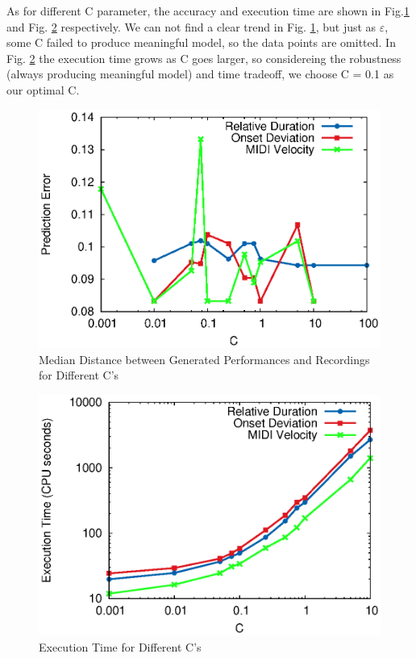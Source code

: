 As for different C parameter, the accuracy and execution time are shown in Fig.\ref{fig:c_accu} and Fig. \ref{fig:c_time} respectively. We can not find a clear trend in Fig. \ref{fig:c_accu}, but just as $\varepsilon$, some C failed to produce meaningful model, so the data points are omitted. In Fig. \ref{fig:c_time} the execution time grows as C goes larger, so considereing the robustness (always producing meaningful model) and time tradeoff, we choose C = 0.1 as our optimal C.

\begin{figure}[tp]
   \begin{center}
      \includegraphics[width=\textwidth]{fig/C_accu}

   \end{center}
   \caption{Median Distance between Generated Performances and Recordings for Different C's}
   \label{fig:c_accu}
\end{figure}
\begin{figure}[tp]
   \begin{center}
      \includegraphics[width=\textwidth]{fig/C_time}
   \end{center}
   \caption{Execution Time for Different C's}
   \label{fig:c_time}
\end{figure}
